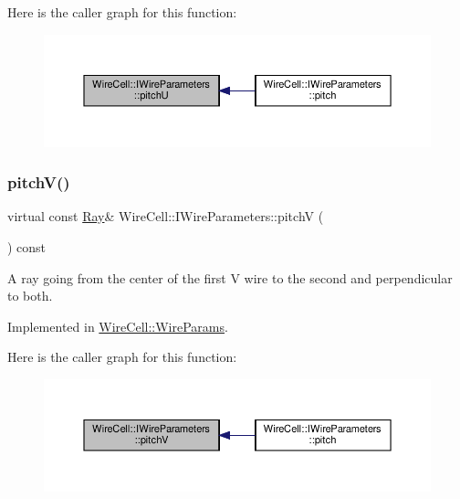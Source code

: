 Here is the caller graph for this function\+:
\nopagebreak
\begin{figure}[H]
\begin{center}
\leavevmode
\includegraphics[width=350pt]{class_wire_cell_1_1_i_wire_parameters_a37e3bb80331664feb75d00eb957fda78_icgraph}
\end{center}
\end{figure}
\mbox{\label{class_wire_cell_1_1_i_wire_parameters_a696c827d971a57805da41e3f2f14ba35}} 
\subsubsection{\texorpdfstring{pitch\+V()}{pitchV()}}
{\footnotesize\ttfamily virtual const \hyperlink{namespace_wire_cell_a3ab20d9b438feb7eb1ffaab9ba98af0c}{Ray}\& Wire\+Cell\+::\+I\+Wire\+Parameters\+::pitchV (\begin{DoxyParamCaption}{ }\end{DoxyParamCaption}) const\hspace{0.3cm}{\ttfamily [pure virtual]}}

A ray going from the center of the first V wire to the second and perpendicular to both. 

Implemented in \hyperlink{class_wire_cell_1_1_wire_params_a5bcff5a348b5ad2a26e8e0a6a3c63258}{Wire\+Cell\+::\+Wire\+Params}.

Here is the caller graph for this function\+:
\nopagebreak
\begin{figure}[H]
\begin{center}
\leavevmode
\includegraphics[width=350pt]{class_wire_cell_1_1_i_wire_parameters_a696c827d971a57805da41e3f2f14ba35_icgraph}
\end{center}
\end{figure}
\mbox{\label{class_wire_cell_1_1_i_wire_parameters_a4e9d46ba775e642112628b79853b58cb}} 
